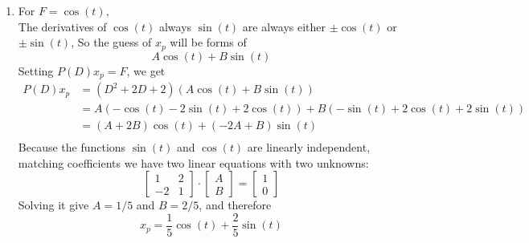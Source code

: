 \begin{enumerate}
\item For $F=\cos (t),$ \\
  The derivatives of $\cos (t)$ always $\sin⁡(t)$ are always
  either $\pm \cos⁡ (t)$ or $\pm \sin⁡ (t)$,
  So the guess of $x_p$ will be forms of 
  \begin{equation*}
    A \cos (t) + B \sin (t) 
  \end{equation*}
  Setting $P(D)x_ p= F$, we get
  \begin{align*}
    P(D)x_p
    &= (D^2+2D+2) \left( A \cos (t) + B \sin (t) \right) \\
    &= A \left(- \cos (t) -2 \sin(t) + 2 \cos (t) \right)
      + B \left(- \sin (t) +2 \cos(t) + 2 \sin (t) \right) \\
    &= (A + 2B) \cos (t) + (-2A + B) \sin (t) \\    
  \end{align*}
  Because the functions $\sin⁡ (t)$ and $\cos⁡ (t)$ are linearly independent,
  matching coefficients we have two linear equations with two unknowns:
  \[
    \begin{bmatrix}
      1 & 2 \\
      -2 & 1
    \end{bmatrix}
    \cdot
    \begin{bmatrix}
      A \\
      B
    \end{bmatrix}
    =
    \begin{bmatrix}
      1 \\
      0
    \end{bmatrix}
  \]
  Solving it give $A = 1/5$ and $B = 2/5$, and therefore
  \begin{equation*}
    x _p = \frac{1}{5} \cos (t) + \frac{2}{5} \sin(t) 
  \end{equation*}


\end{enumerate}
